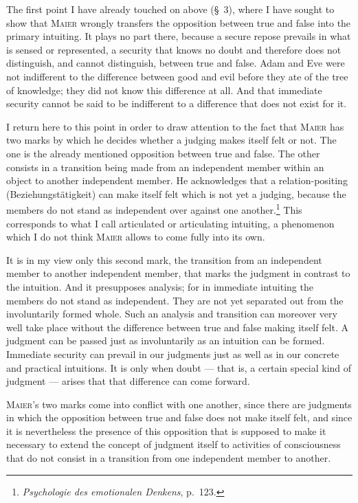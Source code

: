 \documentclass[12pt]{book}
\newcommand{\opage}[1]{\marginnote{\footnotesize\textit{[#1]}}}
\begin{document}
\opage{26}The first point I have already touched on above (§~3), where I have sought to
show that \textsc{Maier} wrongly transfers the opposition between true and false
into the primary intuiting. It plays no part there, because a secure repose
prevails in what is sensed or represented, a security that knows no doubt and
therefore does not distinguish, and cannot distinguish, between true and false.
Adam and Eve were not indifferent to the difference between good and evil before
they ate of the tree of knowledge; they did not know this difference at all. And
that immediate security cannot be said to be indifferent to a difference that
does not exist for it.

I return here to this point in order to draw attention to the fact that
\textsc{Maier} has two marks by which he decides whether a judging makes itself
felt or not. The one is the already mentioned opposition between true and false.
The other consists in a transition being made from an independent member within
an object to another independent member. He acknowledges that a relation-positing
(Beziehungstätigkeit) can make itself felt which is not yet a judging, because
the members do not stand as independent over against one
another.\footnote{\textit{Psychologie des emotionalen Denkens}, p.\ 123.} This
corresponds to what I call articulated or articulating intuiting, a phenomenon
which I do not think \textsc{Maier} allows to come fully into its own.

It is in my view only this second mark, the transition from an independent member
to another independent member, that marks the judgment in contrast to the
intuition. And it presupposes analysis; for in immediate intuiting the members do
not stand as independent. They are not yet separated out from the involuntarily
formed whole. Such an analysis and transition can moreover very well take place
without the difference between true and false making itself felt. A judgment can
be passed just as involuntarily as an intuition can be formed. Immediate security
can prevail in our judgments just as well as in our concrete and practical
intuitions. It is only when doubt --- that is, a certain special kind of judgment
--- arises that that difference can come forward.

\textsc{Maier}'s two marks come into conflict with one another, since there are
judgments in which the opposition between true and false does not make itself
felt, and since it is nevertheless the presence of this opposition that is
supposed to make it necessary to extend the concept of judgment itself to
activities of consciousness that do not consist in a transition from one
independent member to another.
\end{document}
